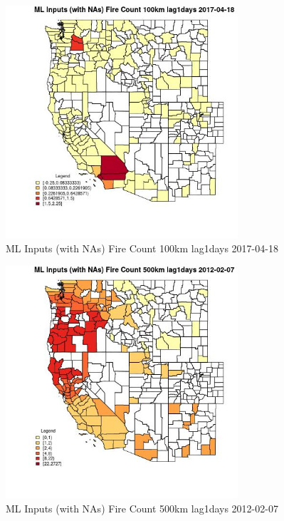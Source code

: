 \begin{figure} 
\centering  
\includegraphics[width=0.77\textwidth]{Code_Outputs/Report_ML_input_PM25_Step4_part_f_de_duplicated_aveswNAs_CountyFire_Count_100km_lag1daysMean2017-04-18.jpg} 
\caption{\label{fig:Report_ML_input_PM25_Step4_part_f_de_duplicated_aveswNAsCountyFire_Count_100km_lag1daysMean2017-04-18}ML Inputs (with NAs) Fire Count 100km lag1days 2017-04-18} 
\end{figure} 
 

\begin{figure} 
\centering  
\includegraphics[width=0.77\textwidth]{Code_Outputs/Report_ML_input_PM25_Step4_part_f_de_duplicated_aveswNAs_CountyFire_Count_500km_lag1daysMean2012-02-07.jpg} 
\caption{\label{fig:Report_ML_input_PM25_Step4_part_f_de_duplicated_aveswNAsCountyFire_Count_500km_lag1daysMean2012-02-07}ML Inputs (with NAs) Fire Count 500km lag1days 2012-02-07} 
\end{figure} 
 

